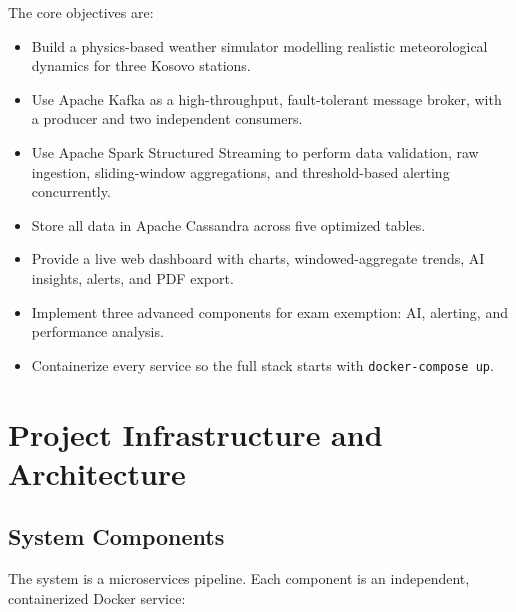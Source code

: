 \documentclass[conference,a4paper]{IEEEtran}
\begin{document}
The core objectives are:
\begin{itemize}
  \item Build a physics-based weather simulator modelling realistic meteorological dynamics for three Kosovo stations.
  \item Use Apache Kafka as a high-throughput, fault-tolerant message broker, with a producer and two independent consumers.
  \item Use Apache Spark Structured Streaming to perform data validation, raw ingestion, sliding-window aggregations, and threshold-based alerting concurrently.
  \item Store all data in Apache Cassandra across five optimized tables.
  \item Provide a live web dashboard with charts, windowed-aggregate trends, AI insights, alerts, and PDF export.
  \item Implement three advanced components for exam exemption: AI, alerting, and performance analysis.
  \item Containerize every service so the full stack starts with \texttt{docker-compose up}.
\end{itemize}

\section{Project Infrastructure and Architecture}

\subsection{System Components}

The system is a microservices pipeline. Each component is an independent,
containerized Docker service:
\end{document}
